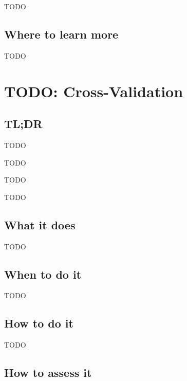 \documentclass[
]{book}
\providecommand{\tightlist}{%
  \setlength{\itemsep}{0pt}\setlength{\parskip}{0pt}}
\begin{document}
TODO

\hypertarget{where-to-learn-more-7}{%
\section{Where to learn more}\label{where-to-learn-more-7}}

TODO

\hypertarget{cross-validation}{%
\chapter{TODO: Cross-Validation}\label{cross-validation}}

\hypertarget{tldr-8}{%
\section{TL;DR}\label{tldr-8}}

\begin{description}
\tightlist
\item[What it does]
TODO
\item[When to do it]
TODO
\item[How to do it]
TODO
\item[How to assess it]
TODO
\end{description}

\hypertarget{what-it-does-8}{%
\section{What it does}\label{what-it-does-8}}

TODO

\hypertarget{when-to-do-it-8}{%
\section{When to do it}\label{when-to-do-it-8}}

TODO

\hypertarget{how-to-do-it-8}{%
\section{How to do it}\label{how-to-do-it-8}}

TODO

\hypertarget{how-to-assess-it-8}{%
\section{How to assess it}\label{how-to-assess-it-8}}
\end{document}
